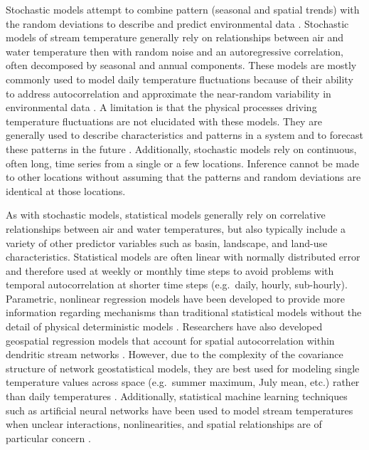 \documentclass[]{article}
\begin{document}
Stochastic models attempt to combine pattern (seasonal and spatial
trends) with the random deviations to describe and predict environmental
data \citep{Chang2013, Sura2006, Kiraly2002}. Stochastic models of
stream temperature generally rely on relationships between air and water
temperature then with random noise and an autoregressive correlation,
often decomposed by seasonal and annual components. These models are
mostly commonly used to model daily temperature fluctuations because of
their ability to address autocorrelation and approximate the near-random
variability in environmental data
\citep{Kiraly2002, Caissie2001, Ahmadi-Nedushan2007}. A limitation is
that the physical processes driving temperature fluctuations are not
elucidated with these models. They are generally used to describe
characteristics and patterns in a system and to forecast these patterns
in the future \citep{Kiraly2002}. Additionally, stochastic models rely
on continuous, often long, time series from a single or a few locations.
Inference cannot be made to other locations without assuming that the
patterns and random deviations are identical at those locations.

As with stochastic models, statistical models generally rely on
correlative relationships between air and water temperatures, but also
typically include a variety of other predictor variables such as basin,
landscape, and land-use characteristics. Statistical models are often
linear with normally distributed error and therefore used at weekly or
monthly time steps to avoid problems with temporal autocorrelation at
shorter time steps (e.g.~daily, hourly, sub-hourly). Parametric,
nonlinear regression models have been developed to provide more
information regarding mechanisms than traditional statistical models
without the detail of physical deterministic models \citep{Mohseni1998}.
Researchers have also developed geospatial regression models that
account for spatial autocorrelation within dendritic stream networks
\citep{Isaak2010b, Peterson2010, Peterson2013}. However, due to the
complexity of the covariance structure of network geostatistical models,
they are best used for modeling single temperature values across space
(e.g.~summer maximum, July mean, etc.) rather than daily temperatures
\citep{Peterson2010, Peterson2007, VerHoef2010}. Additionally,
statistical machine learning techniques such as artificial neural
networks have been used to model stream temperatures when unclear
interactions, nonlinearities, and spatial relationships are of
particular concern \citep{Sivri2009, Sivri2007, DeWeber2014}.
\end{document}
